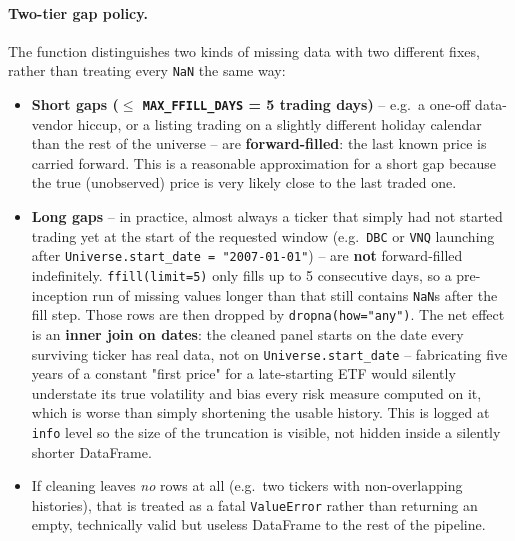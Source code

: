 \documentclass[11pt]{article}
\begin{document}
\paragraph{Two-tier gap policy.} The function distinguishes two kinds of
missing data with two different fixes, rather than treating every
\texttt{NaN} the same way:
\begin{itemize}
    \item \textbf{Short gaps ($\leq$ \texttt{MAX\_FFILL\_DAYS} = 5
    trading days)} -- e.g.\ a one-off data-vendor hiccup, or a listing
    trading on a slightly different holiday calendar than the rest of
    the universe -- are \textbf{forward-filled}: the last known price is
    carried forward. This is a reasonable approximation for a short gap
    because the true (unobserved) price is very likely close to the last
    traded one.
    \item \textbf{Long gaps} -- in practice, almost always a ticker that
    simply had not started trading yet at the start of the requested
    window (e.g.\ \texttt{DBC} or \texttt{VNQ} launching after
    \texttt{Universe.start\_date = "2007-01-01"}) -- are \textbf{not}
    forward-filled indefinitely. \texttt{ffill(limit=5)} only fills up to
    5 consecutive days, so a pre-inception run of missing values longer
    than that still contains \texttt{NaN}s after the fill step. Those
    rows are then dropped by \texttt{dropna(how="any")}. The net effect
    is an \textbf{inner join on dates}: the cleaned panel starts on the
    date every surviving ticker has real data, not on
    \texttt{Universe.start\_date} -- fabricating five years of a
    constant "first price" for a late-starting ETF would silently
    understate its true volatility and bias every risk measure computed
    on it, which is worse than simply shortening the usable history.
    This is logged at \texttt{info} level so the size of the truncation
    is visible, not hidden inside a silently shorter DataFrame.
    \item If cleaning leaves \emph{no} rows at all (e.g.\ two tickers
    with non-overlapping histories), that is treated as a fatal
    \texttt{ValueError} rather than returning an empty, technically
    valid but useless DataFrame to the rest of the pipeline.
\end{itemize}
\end{document}
